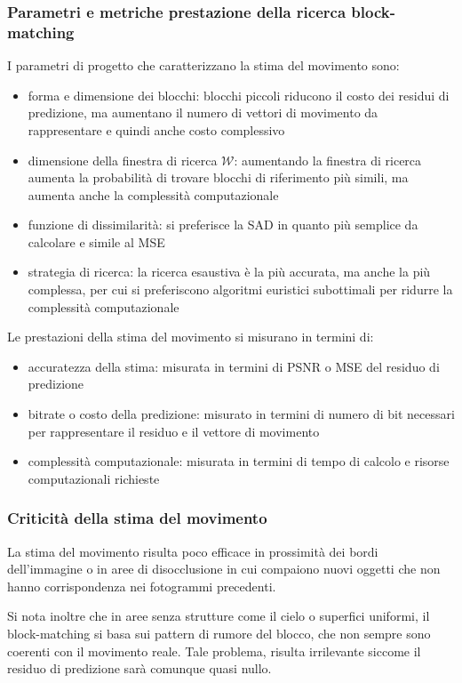 \subsubsection*{Parametri e metriche prestazione della ricerca block-matching}
I parametri di progetto che caratterizzano la stima del movimento sono:
\begin{itemize}
	\item forma e dimensione dei blocchi: blocchi piccoli riducono il costo dei residui di predizione, ma aumentano il
	numero di vettori di movimento da rappresentare e quindi anche costo complessivo
	\item dimensione della finestra di ricerca \(\mathcal{W}\): aumentando la finestra di ricerca aumenta la probabilità
	di trovare blocchi di riferimento più simili, ma aumenta anche la complessità computazionale
	\item funzione di dissimilarità: si preferisce la SAD in quanto più semplice da calcolare e simile al MSE
	\item strategia di ricerca: la ricerca esaustiva è la più accurata, ma anche la più complessa, per cui si preferiscono
	algoritmi euristici subottimali per ridurre la complessità computazionale
\end{itemize}
\noindent
Le prestazioni della stima del movimento si misurano in termini di:
\begin{itemize}
	\item accuratezza della stima: misurata in termini di PSNR o MSE del residuo di predizione
	\item bitrate o costo della predizione: misurato in termini di numero di bit necessari per rappresentare il residuo
	e il vettore di movimento
	\item complessità computazionale: misurata in termini di tempo di calcolo e risorse computazionali richieste
\end{itemize}

\subsubsection*{Criticità della stima del movimento}
La stima del movimento risulta poco efficace in prossimità dei bordi dell'immagine o in aree di disocclusione in cui
compaiono nuovi oggetti che non hanno corrispondenza nei fotogrammi precedenti.

Si nota inoltre che in aree senza strutture come il cielo o superfici uniformi, il block-matching si basa sui pattern di rumore
del blocco, che non sempre sono coerenti con il movimento reale. Tale problema, risulta irrilevante siccome il residuo di
predizione sarà comunque quasi nullo.

